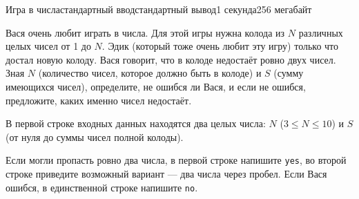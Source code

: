 \begin{problem}{Игра в числа}{стандартный ввод}{стандартный вывод}{1 секунда}{256 мегабайт}

Вася очень любит играть в числа. Для этой игры нужна колода из $N$ различных целых чисел от 1 до $N$.
Эдик (который тоже очень любит эту игру) только что достал новую колоду.
Вася говорит, что в колоде недостаёт ровно двух чисел.
Зная $N$ (количество чисел, которое должно быть в колоде) и $S$ (сумму имеющихся чисел),
определите, не ошибся ли Вася, и если не ошибся, предложите, каких именно чисел недостаёт.

\InputFile
В первой строке входных данных находятся два целых числа: $N$ ($3 \le N \le 10$)
и $S$ (от нуля до суммы чисел полной колоды).

\OutputFile
Если могли пропасть ровно два числа, в первой строке напишите \texttt{yes},
во второй строке приведите возможный вариант --- два числа через пробел.
Если Вася ошибся, в единственной строке напишите \texttt{no}.

\Examples

\begin{example}
%
%
\end{example}

\end{problem}

